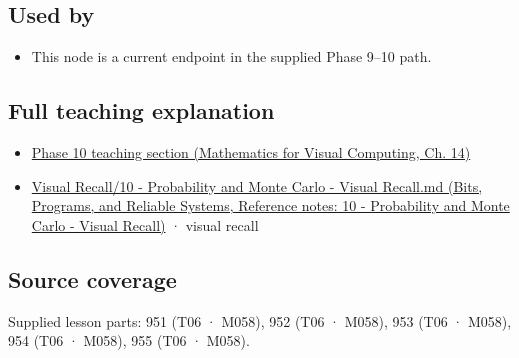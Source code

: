 \subsection{Used by}\label{appendix-33237f0f618b-used-by}

\begin{itemize}
\tightlist
\item
  This node is a current endpoint in the supplied Phase 9--10 path.
\end{itemize}

\subsection{Full teaching explanation}\label{appendix-33237f0f618b-full-teaching-explanation}

\begin{itemize}
\tightlist
\item
  \href{../02-Mathematics-for-Visual-Computing/main.pdf\#nameddest=02-foundations-ii-ch030-finite-samples-need-stable-descriptive-statistics}{Phase 10 teaching section (Mathematics for Visual Computing, Ch. 14)}
\item
  \href{../01-Bits-Programs-and-Reliable-Systems/main.pdf\#nameddest=appendix-cb5af353ef77}{Visual Recall/10 - Probability and Monte Carlo - Visual Recall.md (Bits, Programs, and Reliable Systems, Reference notes: 10 - Probability and Monte Carlo - Visual Recall)} · visual recall
\end{itemize}

\subsection{Source coverage}\label{appendix-33237f0f618b-source-coverage}

Supplied lesson parts: 951 (T06 · M058), 952 (T06 · M058), 953 (T06 · M058), 954 (T06 · M058), 955 (T06 · M058).

